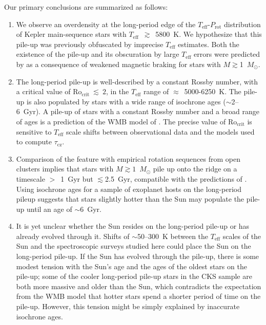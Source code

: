 \documentclass[linenumbers,tighten,trackchanges,twocolumn]{aastex631}
\newcommand{\taucz}{$\tau_\mathrm{cz}$\xspace}
\newcommand{\rocrit}{$\mathrm{Ro_{crit}}$\xspace}
\newcommand{\rocritfinal}{$\mathrm{Ro_{crit}}~\lesssim~2$\xspace}
\newcommand{\agerange}{$\sim$2--6~Gyr\xspace}
\newcommand{\teff}{\ensuremath{T_{\mathrm{eff}}}\xspace}
\newcommand{\msun}{$M_\odot$\xspace}
\newcommand{\prot}{\ensuremath{P_\mathrm{rot}}\xspace}
\begin{document}
Our primary conclusions are summarized as follows:

\begin{enumerate}
    \item We observe an overdensity at the long-period edge of the \teff-\prot distribution of Kepler main-sequence stars with \teff~$\gtrsim$~5800~K. We hypothesize that this pile-up was previously obfuscated by imprecise \teff estimates. Both the existence of the pile-up and its obscuration by large \teff errors were predicted by \citet{vanSaders2019} as a consequence of weakened magnetic braking for stars with $M\gtrsim$1~\msun. 
    
    \item The long-period pile-up is well-described by a constant Rossby number, with a critical value of \rocritfinal, in the \teff range of $\approx$~5000-6250~K. The pile-up is also populated by stars with a wide range of isochrone ages (\agerange). A pile-up of stars with a constant Rossby number and a broad range of ages is a prediction of the WMB model of \citet{vanSaders2016, vanSaders2019}. The precise value of \rocrit is sensitive to \teff scale shifts between observational data and the models used to compute \taucz. 

    \item Comparison of the feature with empirical rotation sequences from open clusters implies that stars with $M\gtrsim1$~\msun pile up onto the ridge on a timescale $>$~1~Gyr but $\lesssim$2.5~Gyr, compatible with the predictions of \citet{vanSaders2019}. Using isochrone ages for a sample of exoplanet hosts on the long-period pileup suggests that stars slightly hotter than the Sun may populate the pile-up until an age of $\sim$6~Gyr.
    
    \item It is yet unclear whether the Sun resides on the long-period pile-up or has already evolved through it. Shifts of $\sim$50--300~K between the \teff scales of the Sun and the spectroscopic surveys studied here could place the Sun on the long-period pile-up. If the Sun has evolved through the pile-up, there is some modest tension with the Sun's age and the ages of the oldest stars on the pile-up; some of the cooler long-period pile-up stars in the CKS sample are both more massive and older than the Sun, which contradicts the expectation from the WMB model that hotter stars spend a shorter period of time on the pile-up. However, this tension might be simply explained by inaccurate isochrone ages.
    

\end{enumerate}
\end{document}
